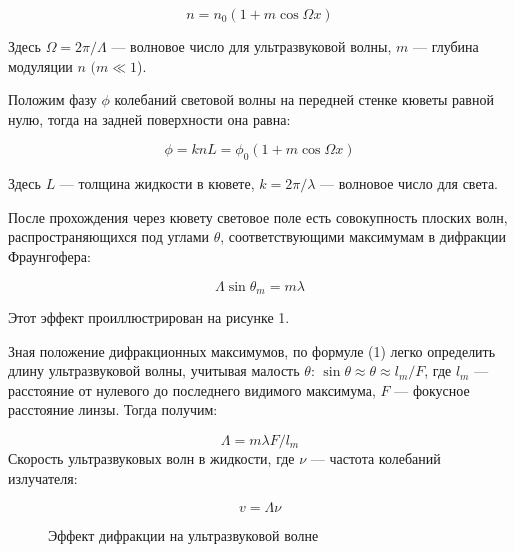 \documentclass[a4paper,12pt]{article} %
\begin{document}
	\begin{equation}\label{}
	n = n_0 (1 + m \cos \Omega x)
	\end{equation}
	
	Здесь $ \Omega = 2 \pi / \Lambda $ --- волновое число для ультразвуковой волны, $ m $ --- глубина модуляции $ n $ $ (m \ll 1 $).
	
	Положим фазу $ \phi $ колебаний световой волны на передней стенке кюветы равной нулю, тогда на задней поверхности она равна:
	
	\begin{equation}\label{}
	\phi  = k n L = \phi_0 (1 + m \cos \Omega x)
	\end{equation}
	
	Здесь $ L $ --- толщина жидкости в кювете, $ k = 2 \pi / \lambda $ --- волновое число для света.
	
	После прохождения через кювету световое поле есть совокупность плоских волн, распространяющихся под углами $ \theta $, соответствующими максимумам в дифракции Фраунгофера:
	
\begin{equation}\label{}	
	\Lambda \sin \theta_m = m \lambda
\end{equation}

Этот эффект проиллюстрирован на рисунке 1.

	Зная положение дифракционных максимумов, по формуле (1) легко определить длину ультразвуковой волны, учитывая малость $ \theta $: $ \sin \theta \approx \theta \approx l_m /F  $, где $ l_m $ --- расстояние от нулевого до последнего видимого максимума, $ F $ --- фокусное расстояние линзы. Тогда получим:
	
	\begin{equation}\label{}
	 \Lambda = m \lambda F/ l_m 
	\end{equation}
	Скорость ультразвуковых волн в жидкости, где $ \nu $ --- частота колебаний излучателя:
	
\begin{equation}\label{}
	v = \Lambda \nu 
\end{equation}

\begin{figure}[H]
  \caption{Эффект дифракции на ультразвуковой волне}
	\label{fig:image1}
\end{figure}
\end{document}

